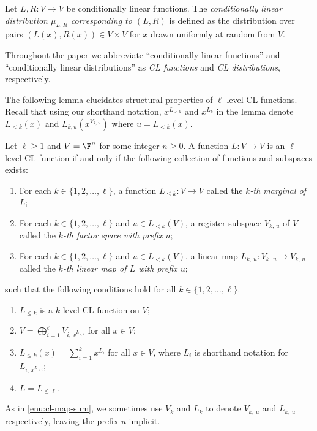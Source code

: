 \begin{definition}
  \label{def:cl-dist}
  Let $L, R: V \to V$ be conditionally linear functions.
  The \emph{conditionally linear distribution $\mu_{L,R}$ corresponding to $(L,
    R)$} is defined as the distribution over pairs $(L(x), R(x)) \in V \times V$
  for $x$ drawn uniformly at random from $V$.
\end{definition}

Throughout the paper we abbreviate ``conditionally linear functions'' and
``conditionally linear distributions'' as \emph{CL functions} and \emph{CL
  distributions}, respectively.

The following lemma elucidates structural properties of $\ell$-level CL
functions.
Recall that using our shorthand notation, $x^{L_{<k}}$ and $x^{L_k}$ in the
lemma denote $L_{<k}(x)$ and $L_{k,u}(x^{V_{k,\, u}})$ where $u = L_{<k}(x)$.


\begin{lemma}
  \label{lem:cl-kth}
	Let $\ell \geq 1$ and $V = \F^n$ for some integer $n \geq 0$.
  A function $L: V \to V$ is an $\ell$-level CL function if and only if the
  following collection of functions and subspaces exists:
  \begin{enumerate}[label=(\roman*)]
  \item \label{enu:cl-k-marginal} For each $k \in \{1, 2, \ldots, \ell\}$, a
    function $L_{\le k} : V \to V$ called the \emph{$k$-th marginal of $L$};
  \item \label{enu:cl-k-space} For each $k \in \{1, 2, \ldots, \ell\}$ and $u
    \in L_{<k} (V)$, a register subspace $V_{k,\, u}$ of $V$ called the
    \emph{$k$-th factor space with prefix $u$};
  \item \label{enu:cl-k-map} For each $k \in \{1, 2, \ldots, \ell\}$ and $u \in
    L_{<k} (V)$, a linear map $L_{k,\, u} : V_{k,\, u} \to V_{k,\, u}$ called
    the \emph{$k$-th linear map of $L$ with prefix $u$};
  \end{enumerate}
  such that the following conditions hold for all $k \in \{1, 2, \ldots,
  \ell\}$.
  \begin{enumerate}
  \item \label{enu:cl-k-cl} $L_{\leq k}$ is a $k$-level CL function on $V$;
	\item \label{enu:cl-space-sum} $V = \bigoplus_{i = 1}^\ell V_{i,\,
      x^{L_{<i}}}$ for all $x \in V$;
\item \label{enu:cl-map-sum} $L_{\leq k}(x) = \sum_{i = 1}^{k} x^{L_i}$ for
    all $x \in V$, where $L_i$ is shorthand notation for $L_{i,\,
      x^{L_{<i}}}$;
  \item \label{enu:cl-last-ell} $L = L_{\leq \ell}$.
  \end{enumerate}
  As in \cref{enu:cl-map-sum}, we sometimes use $V_k$ and $L_k$ to denote
  $V_{k,\, u}$ and $L_{k,\, u}$ respectively, leaving the prefix $u$ implicit.
\end{lemma}

